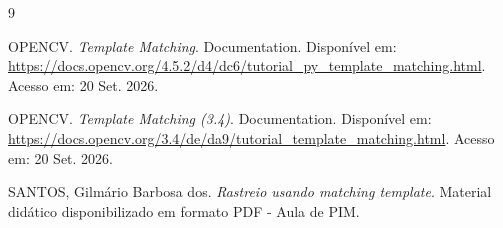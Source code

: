 \documentclass[12pt]{article}
\begin{document}
\begin{thebibliography}{9}

OPENCV.
\textit{Template Matching}. Documentation.
Disponível em: \url{https://docs.opencv.org/4.5.2/d4/dc6/tutorial_py_template_matching.html}.
Acesso em: 20 Set. 2026.

OPENCV.
\textit{Template Matching (3.4)}. Documentation.
Disponível em: \url{https://docs.opencv.org/3.4/de/da9/tutorial_template_matching.html}.
Acesso em: 20 Set. 2026.

SANTOS, Gilmário Barbosa dos.
\textit{Rastreio usando matching template}.
Material didático disponibilizado em formato PDF - Aula de PIM.

\end{thebibliography}
\end{document}
